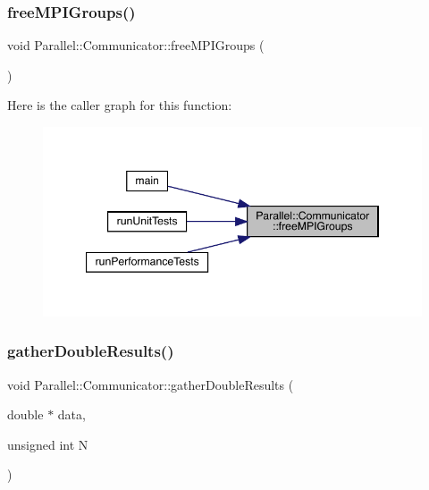\subsubsection{\texorpdfstring{freeMPIGroups()}{freeMPIGroups()}}
{\footnotesize\ttfamily void Parallel\+::\+Communicator\+::free\+M\+P\+I\+Groups (\begin{DoxyParamCaption}{ }\end{DoxyParamCaption})\hspace{0.3cm}{\ttfamily [static]}}

Here is the caller graph for this function\+:\nopagebreak
\begin{figure}[H]
\begin{center}
\leavevmode
\includegraphics[width=347pt]{class_parallel_1_1_communicator_adc5e4acb372e9db19276572007940832_icgraph}
\end{center}
\end{figure}
\mbox{\label{class_parallel_1_1_communicator_a6c60f0fbbe23ef0bf342b0157d080007}} 
\subsubsection{\texorpdfstring{gatherDoubleResults()}{gatherDoubleResults()}}
{\footnotesize\ttfamily void Parallel\+::\+Communicator\+::gather\+Double\+Results (\begin{DoxyParamCaption}\item[{double $\ast$}]{data,  }\item[{unsigned int}]{N }\end{DoxyParamCaption})\hspace{0.3cm}{\ttfamily [static]}}

